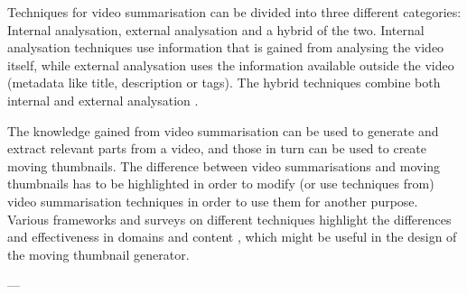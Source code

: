 \documentclass{../resources/acm_proc_article-sp}
\begin{document}
Techniques for video summarisation can be divided into three different categories: Internal analysation, external analysation and a hybrid of the two. Internal analysation techniques use information that is gained from analysing the video itself, while external analysation uses the information available outside the video (metadata like title, description or tags). The hybrid techniques combine both internal and external analysation \cite{Money:2008fn}.

The knowledge gained from video summarisation can be used to generate and extract relevant parts from a video, and those in turn can be used to create moving thumbnails. The difference between video summarisations and moving thumbnails has to be highlighted in order to modify (or use techniques from) video summarisation techniques in order to use them for another purpose. Various frameworks and surveys on different techniques highlight the differences and effectiveness in domains and content \cite{Money:2008fn,Ajmal:2012hi}, which might be useful in the design of the moving thumbnail generator.

---

%
%
%
%
%
%
\end{document}
